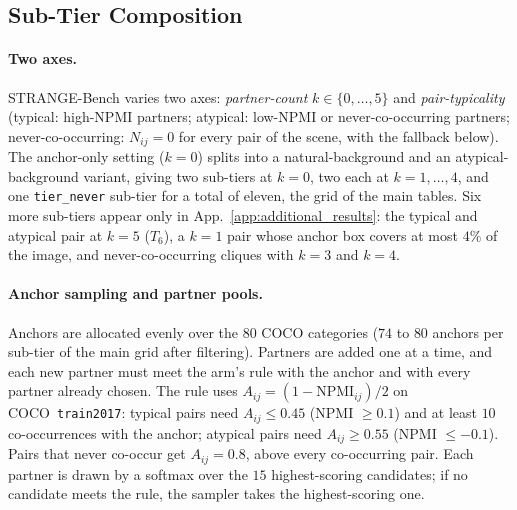 \clearpage
\subsection{Sub-Tier Composition}
\label{app:strange:tiers}

\paragraph{Two axes.}
STRANGE-Bench varies two axes: \emph{partner-count} $k\!\in\!\{0,\dots,5\}$ and \emph{pair-typicality} (typical: high-NPMI partners; atypical: low-NPMI or never-co-occurring partners; never-co-occurring: $N_{ij}\!=\!0$ for every pair of the scene, with the fallback below). The anchor-only setting ($k\!=\!0$) splits into a natural-background and an atypical-background variant, giving two sub-tiers at $k\!=\!0$, two each at $k\!=\!1,\dots,4$, and one \texttt{tier\_never} sub-tier for a total of eleven, the grid of the main tables. Six more sub-tiers appear only in App.~\ref{app:additional_results}: the typical and atypical pair at $k\!=\!5$ ($T_6$), a $k\!=\!1$ pair whose anchor box covers at most $4\%$ of the image, and never-co-occurring cliques with $k\!=\!3$ and $k\!=\!4$.

\paragraph{Anchor sampling and partner pools.}
Anchors are allocated evenly over the $80$ COCO categories ($74$ to $80$ anchors per sub-tier of the main grid after filtering). Partners are added one at a time, and each new partner must meet the arm's rule with the anchor and with every partner already chosen. The rule uses $A_{ij} = (1 - \text{NPMI}_{ij})/2$ on COCO~\texttt{train2017}: typical pairs need $A_{ij} \leq 0.45$ (NPMI $\geq 0.1$) and at least $10$ co-occurrences with the anchor; atypical pairs need $A_{ij} \geq 0.55$ (NPMI $\leq -0.1$). Pairs that never co-occur get $A_{ij} = 0.8$, above every co-occurring pair. Each partner is drawn by a softmax over the $15$ highest-scoring candidates; if no candidate meets the rule, the sampler takes the highest-scoring one. 

